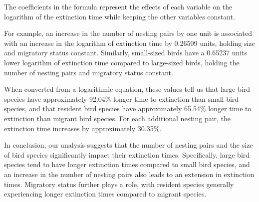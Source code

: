\documentclass{article}
\begin{document}
The coefficients in the formula represent the effects of each variable
on the logarithm of the extinction time while keeping the other
variables constant.

For example, an increase in the number of nesting pairs by one unit is
associated with an increase in the logarithm of extinction time by
0.26509 units, holding size and migratory status constant. Similarly,
small-sized birds have a 0.65237 units lower logarithm of extinction
time compared to large-sized birds, holding the number of nesting pairs
and migratory status constant.

When converted from a logarithmic equation, these values tell us that large bird species have approximately 92.04\% longer time to extinction than small bird species, and that
resident bird species have approximately 65.54\% longer time to extinction than migrant bird species.
For each additional nesting pair, the extinction time increases by approximately 30.35\%.

In conclusion, our analysis suggests that the number of nesting pairs and the size of bird species significantly impact their extinction times. Specifically, large bird species tend to have longer extinction times compared to small bird species, and an increase in the number of nesting pairs also leads to an extension in extinction times. Migratory status further plays a role, with resident species generally experiencing longer extinction times compared to migrant species.
\end{document}
